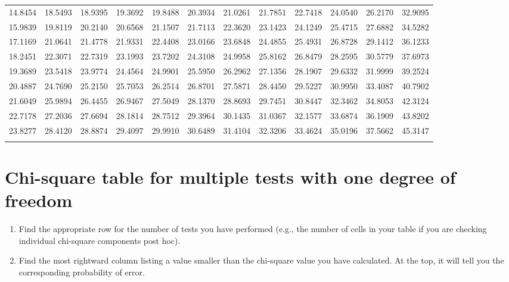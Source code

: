 \begin{table}[H]
{\begin{tabular}[t]{*{12}{S[table-format=2.2]}}
14.8454 & 18.5493 & 18.9395 & 19.3692 & 19.8488 & 20.3934 & 21.0261 & 21.7851 & 22.7418 & 24.0540 & 26.2170 & 32.9095 \\
15.9839 & 19.8119 & 20.2140 & 20.6568 & 21.1507 & 21.7113 & 22.3620 & 23.1423 & 24.1249 & 25.4715 & 27.6882 & 34.5282 \\
17.1169 & 21.0641 & 21.4778 & 21.9331 & 22.4408 & 23.0166 & 23.6848 & 24.4855 & 25.4931 & 26.8728 & 29.1412 & 36.1233 \\
18.2451 & 22.3071 & 22.7319 & 23.1993 & 23.7202 & 24.3108 & 24.9958 & 25.8162 & 26.8479 & 28.2595 & 30.5779 & 37.6973 \\
19.3689 & 23.5418 & 23.9774 & 24.4564 & 24.9901 & 25.5950 & 26.2962 & 27.1356 & 28.1907 & 29.6332 & 31.9999 & 39.2524 \\
20.4887 & 24.7690 & 25.2150 & 25.7053 & 26.2514 & 26.8701 & 27.5871 & 28.4450 & 29.5227 & 30.9950 & 33.4087 & 40.7902 \\
21.6049 & 25.9894 & 26.4455 & 26.9467 & 27.5049 & 28.1370 & 28.8693 & 29.7451 & 30.8447 & 32.3462 & 34.8053 & 42.3124 \\
22.7178 & 27.2036 & 27.6694 & 28.1814 & 28.7512 & 29.3964 & 30.1435 & 31.0367 & 32.1577 & 33.6874 & 36.1909 & 43.8202 \\
23.8277 & 28.4120 & 28.8874 & 29.4097 & 29.9910 & 30.6489 & 31.4104 & 32.3206 & 33.4624 & 35.0196 & 37.5662 & 45.3147 \\
\lspbottomrule
\end{tabular}}
\end{table}

\pagebreak

\section{Chi-square table for multiple tests with one degree of freedom}
\label{sec:chisquaremultiple}

\begin{enumerate}
  \item Find the appropriate row for the number of tests you have performed (e.g., the number of cells in your table if you are checking individual chi-square components post hoc).
  \item Find the most rightward column listing a value smaller than the chi-square value you have calculated. At the top, it will tell you the corresponding probability of error.
\end{enumerate}

